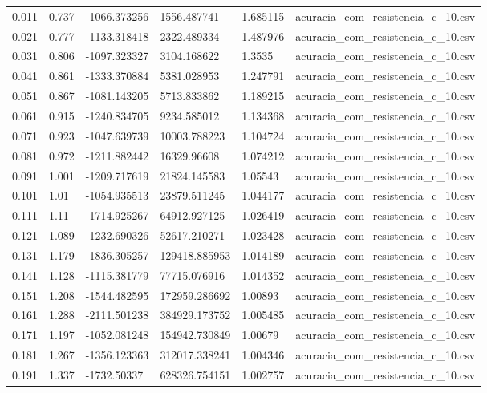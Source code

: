 \begin{table}
\begin{tabular}{llllll}
0.011 & 0.737 & -1066.373256 & 1556.487741 & 1.685115 & acuracia\_com\_resistencia\_c\_10.csv \\
0.021 & 0.777 & -1133.318418 & 2322.489334 & 1.487976 & acuracia\_com\_resistencia\_c\_10.csv \\
0.031 & 0.806 & -1097.323327 & 3104.168622 & 1.3535 & acuracia\_com\_resistencia\_c\_10.csv \\
0.041 & 0.861 & -1333.370884 & 5381.028953 & 1.247791 & acuracia\_com\_resistencia\_c\_10.csv \\
0.051 & 0.867 & -1081.143205 & 5713.833862 & 1.189215 & acuracia\_com\_resistencia\_c\_10.csv \\
0.061 & 0.915 & -1240.834705 & 9234.585012 & 1.134368 & acuracia\_com\_resistencia\_c\_10.csv \\
0.071 & 0.923 & -1047.639739 & 10003.788223 & 1.104724 & acuracia\_com\_resistencia\_c\_10.csv \\
0.081 & 0.972 & -1211.882442 & 16329.96608 & 1.074212 & acuracia\_com\_resistencia\_c\_10.csv \\
0.091 & 1.001 & -1209.717619 & 21824.145583 & 1.05543 & acuracia\_com\_resistencia\_c\_10.csv \\
0.101 & 1.01 & -1054.935513 & 23879.511245 & 1.044177 & acuracia\_com\_resistencia\_c\_10.csv \\
0.111 & 1.11 & -1714.925267 & 64912.927125 & 1.026419 & acuracia\_com\_resistencia\_c\_10.csv \\
0.121 & 1.089 & -1232.690326 & 52617.210271 & 1.023428 & acuracia\_com\_resistencia\_c\_10.csv \\
0.131 & 1.179 & -1836.305257 & 129418.885953 & 1.014189 & acuracia\_com\_resistencia\_c\_10.csv \\
0.141 & 1.128 & -1115.381779 & 77715.076916 & 1.014352 & acuracia\_com\_resistencia\_c\_10.csv \\
0.151 & 1.208 & -1544.482595 & 172959.286692 & 1.00893 & acuracia\_com\_resistencia\_c\_10.csv \\
0.161 & 1.288 & -2111.501238 & 384929.173752 & 1.005485 & acuracia\_com\_resistencia\_c\_10.csv \\
0.171 & 1.197 & -1052.081248 & 154942.730849 & 1.00679 & acuracia\_com\_resistencia\_c\_10.csv \\
0.181 & 1.267 & -1356.123363 & 312017.338241 & 1.004346 & acuracia\_com\_resistencia\_c\_10.csv \\
0.191 & 1.337 & -1732.50337 & 628326.754151 & 1.002757 & acuracia\_com\_resistencia\_c\_10.csv \\

\end{tabular}
\end{table}

